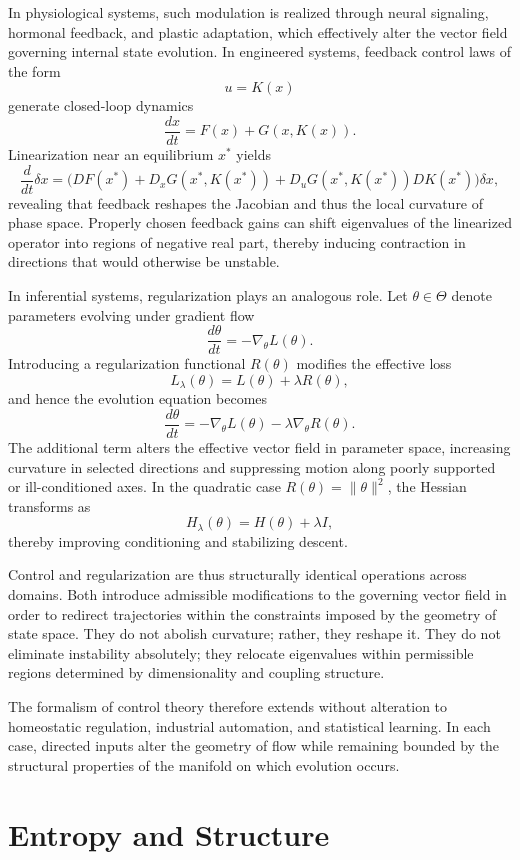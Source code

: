 \documentclass[12pt]{book}
\begin{document}
In physiological systems, such modulation is realized through neural signaling, hormonal feedback, and plastic adaptation, which effectively alter the vector field governing internal state evolution. In engineered systems, feedback control laws of the form
\[
u = K(x)
\]
generate closed-loop dynamics
\[
\frac{dx}{dt} = F(x) + G(x,K(x)).
\]
Linearization near an equilibrium $x^*$ yields
\[
\frac{d}{dt} \delta x
=
\big( DF(x^*) + D_x G(x^*,K(x^*)) + D_u G(x^*,K(x^*)) DK(x^*) \big)\delta x,
\]
revealing that feedback reshapes the Jacobian and thus the local curvature of phase space. Properly chosen feedback gains can shift eigenvalues of the linearized operator into regions of negative real part, thereby inducing contraction in directions that would otherwise be unstable.

In inferential systems, regularization plays an analogous role. Let $\theta \in \Theta$ denote parameters evolving under gradient flow
\[
\frac{d\theta}{dt} = -\nabla_\theta L(\theta).
\]
Introducing a regularization functional $R(\theta)$ modifies the effective loss
\[
L_\lambda(\theta) = L(\theta) + \lambda R(\theta),
\]
and hence the evolution equation becomes
\[
\frac{d\theta}{dt} = -\nabla_\theta L(\theta) - \lambda \nabla_\theta R(\theta).
\]
The additional term alters the effective vector field in parameter space, increasing curvature in selected directions and suppressing motion along poorly supported or ill-conditioned axes. In the quadratic case $R(\theta)=\|\theta\|^2$, the Hessian transforms as
\[
H_\lambda(\theta) = H(\theta) + \lambda I,
\]
thereby improving conditioning and stabilizing descent.

Control and regularization are thus structurally identical operations across domains. Both introduce admissible modifications to the governing vector field in order to redirect trajectories within the constraints imposed by the geometry of state space. They do not abolish curvature; rather, they reshape it. They do not eliminate instability absolutely; they relocate eigenvalues within permissible regions determined by dimensionality and coupling structure.

The formalism of control theory therefore extends without alteration to homeostatic regulation, industrial automation, and statistical learning. In each case, directed inputs alter the geometry of flow while remaining bounded by the structural properties of the manifold on which evolution occurs.

\section{Entropy and Structure}
\end{document}
